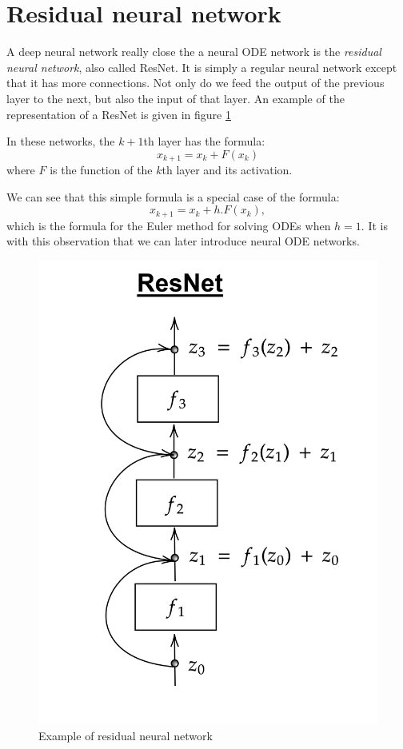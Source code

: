 \documentclass[10pt,a4paper]{article}
\theoremstyle{definition}
\theoremstyle{definition}
\theoremstyle{definition}
\begin{document}

\section{Residual neural network} \label{rnn}

A deep neural network really close the a neural ODE network is the \textit{residual neural network}, also called ResNet. It is simply a regular neural network except that it has more connections. Not only do we feed the output of the previous layer to the next, but also the input of that layer. 
An example of the representation of a ResNet is given in figure \ref{exampleresnet}

In these networks, the $k+1$th layer has the formula:
$$
x_{k+1} = x_k + F(x_k)
$$
where $F$ is the function of the $k$th layer and its activation. 

We can see that this simple formula is a special case of the formula:
$$
x_{k+1} = x_k + h.F(x_k),
$$
which is the formula for the Euler method for solving ODEs when $h = 1$. It is with this observation that we can later introduce neural ODE networks.

\begin{figure}
\center
\includegraphics[scale=0.18]{resnet.png}
\caption{Example of residual neural network}
\label{exampleresnet}
\end{figure}
\end{document}
